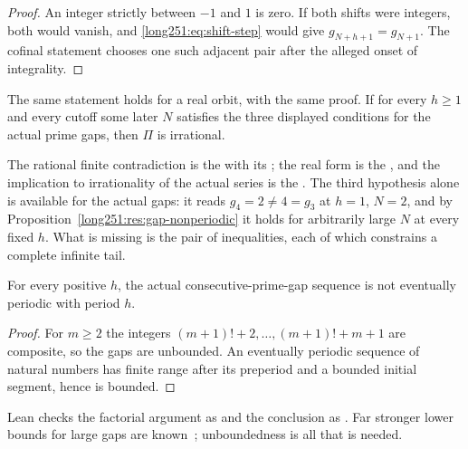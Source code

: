 \begin{proof}
An integer strictly between $-1$ and $1$ is zero.  If both shifts were
integers, both would vanish, and \eqref{long251:eq:shift-step} would give
$g_{N+h+1}=g_{N+1}$.  The cofinal statement chooses one such adjacent pair
after the alleged onset of integrality.
\end{proof}

\begin{corollary}\label{long251:res:smallpair-real}
The same statement holds for a real orbit, with the same proof.  If for every
$h\ge1$ and every cutoff some later $N$ satisfies the three displayed
conditions for the actual prime gaps, then $\Pi$ is irrational.
\end{corollary}

\noindent The rational finite contradiction is the
 with its
; the real form is the
, and the implication to irrationality of the actual
series is the
.  The third hypothesis alone is available for the actual gaps: it
reads $g_4=2\ne4=g_3$ at $h=1$, $N=2$, and by
Proposition~\ref{long251:res:gap-nonperiodic} it holds for arbitrarily large $N$ at
every fixed $h$.  What is missing is the pair of inequalities, each of which
constrains a complete infinite tail.

\begin{proposition}\label{long251:res:gap-nonperiodic}
For every positive $h$, the actual consecutive-prime-gap sequence is not
eventually periodic with period $h$.
\end{proposition}

\begin{proof}
For $m\ge2$ the integers $(m+1)!+2,\ldots,(m+1)!+m+1$ are composite, so the
gaps are unbounded.  An eventually periodic sequence of natural numbers has
finite range after its preperiod and a bounded initial segment, hence is
bounded.
\end{proof}

\noindent Lean checks the factorial argument as
 and the conclusion as
.  Far stronger lower bounds for large gaps are
known~\cite[Theorem~1, p.~66]{fgkmt2018}; unboundedness is all that is needed.

